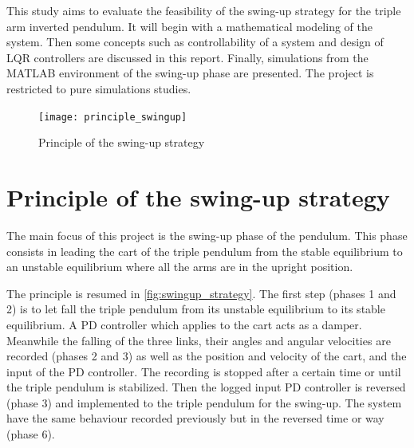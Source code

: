 \documentclass[a4paper,12pt]{article}
\begin{document}
This study aims to evaluate the feasibility of the swing-up strategy for the triple arm inverted pendulum. It will begin with a mathematical modeling of the system. Then some concepts such as controllability of a system and design of LQR controllers are discussed in this report. Finally, simulations from the MATLAB environment of the swing-up phase are presented. The project is restricted to pure simulations studies.


\begin{figure}[ht]
	\centering
	\texttt{[image: principle\_swingup]}
	\caption{Principle of the swing-up strategy}
	\label{fig:swingup_strategy}
\end{figure}
\section{Principle of the swing-up strategy}
The main focus of this project is the swing-up phase of the pendulum. This phase consists in leading the cart of the triple pendulum from the stable equilibrium to an unstable equilibrium where all the arms are in the upright position. 

The principle is resumed in \autoref{fig:swingup_strategy}. The first step (phases 1 and 2) is to let fall the triple pendulum from its unstable equilibrium to its stable equilibrium. A PD controller which applies to the cart acts as a damper. Meanwhile the falling of the three links, their angles and angular velocities are recorded (phases 2 and 3) as well as the position and velocity of the cart, and the input of the PD controller. The recording is stopped after a certain time or until the triple pendulum is stabilized. Then the logged input PD controller is reversed (phase 3) and implemented to the triple pendulum for the swing-up. The system have the same behaviour recorded previously but in the reversed time or way (phase 6). 

\end{document}
